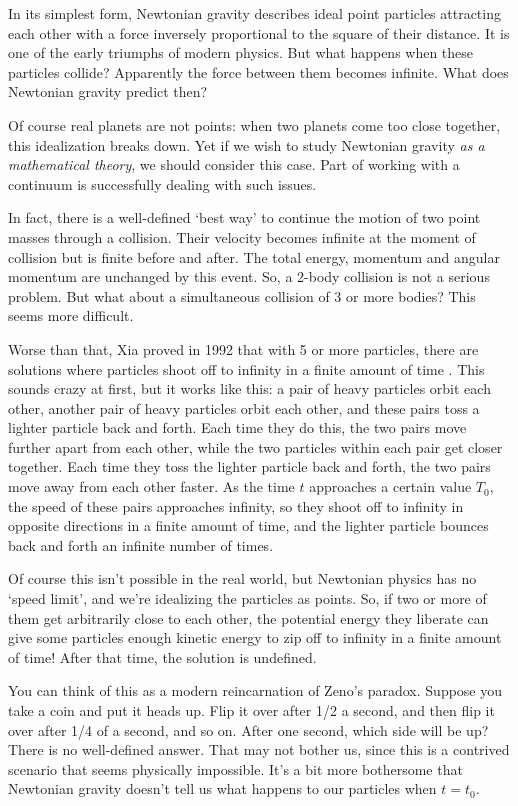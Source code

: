 \documentclass{article}
\begin{document}
In its simplest form, Newtonian gravity describes ideal point particles attracting each other with a force inversely proportional to the square of their distance.  It is one of the early triumphs of modern physics.  But what happens when these particles collide?  Apparently the force between them becomes infinite.  What does Newtonian gravity predict then?

Of course real planets are not points: when two planets come too close together, this idealization breaks down.  Yet if we wish to study Newtonian gravity \emph{as a mathematical theory}, we should consider this case.  Part of working with a continuum is successfully dealing with such issues.

In fact, there is a well-defined `best way' to continue the motion of two point masses through a collision.  Their velocity becomes infinite at the moment of collision but is finite before and after.  The total energy, momentum and angular momentum are unchanged by this event.   So, a 2-body collision is not a serious problem.  But what about a simultaneous collision of 3 or more bodies?  This seems more difficult.

Worse than that, Xia proved in 1992 that with 5 or more particles, there are
solutions where particles shoot off to infinity in a finite amount of time \cite{SaariXia,Xia}.   This sounds crazy at first, but it works like this: a pair of heavy particles orbit each other, another pair of heavy particles orbit each other, and these pairs toss a lighter particle back and forth.  Each time they do this, the two pairs move further apart from each other, while the two particles within each pair get closer together.   Each time they toss the lighter particle back and forth, the two pairs move away from each other faster.  As the time $t$ approaches a certain value $T_0$, the speed of these pairs approaches infinity, so they shoot off to infinity in opposite directions in a finite amount of time, and the lighter particle bounces back and forth an infinite number of times.

Of course this isn't possible in the real world, but Newtonian physics has no `speed limit', and we're idealizing the particles as points. So, if two or more of them get arbitrarily close to each other, the potential energy they liberate can give some particles enough kinetic energy to zip off to infinity in a finite amount of time! After that time, the solution is undefined.  

You can think of this as a modern reincarnation of Zeno's paradox.  Suppose you take a coin and put it heads up.  Flip it over after 1/2 a second, and then flip it over after 1/4 of a second, and so on.  After one second, which side will be up?  There is no well-defined answer.  That may not bother us, since this is a contrived scenario that seems physically impossible.  It's a bit more bothersome that Newtonian gravity doesn't tell us what happens to our particles when $t = t_0$.
\end{document}
